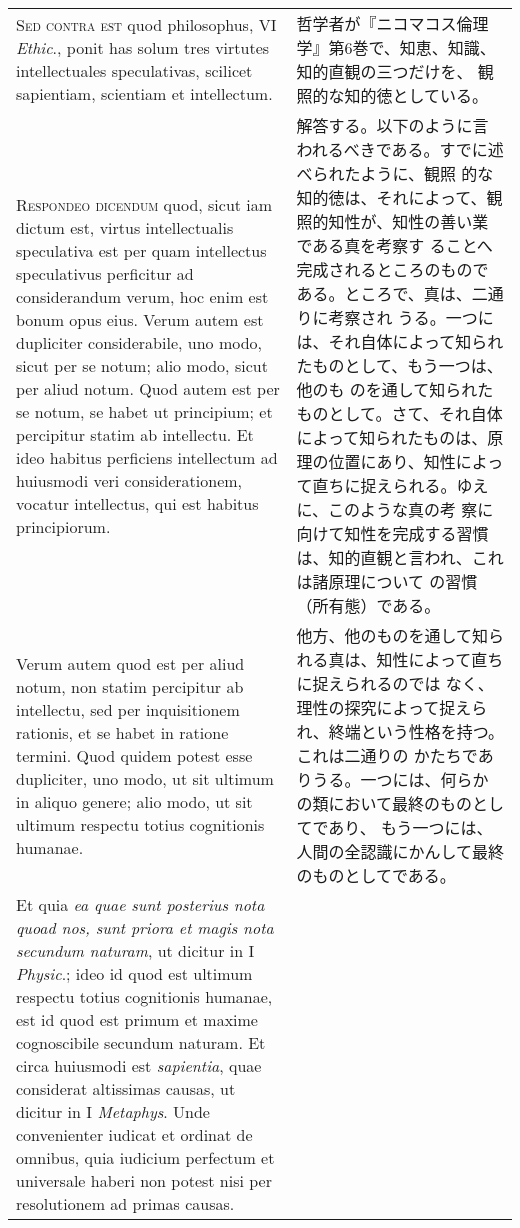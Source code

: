 \documentclass[10pt]{jsarticle}
\begin{document}
\begin{longtable}{p{21em}p{21em}}
\\

{\scshape Sed contra est} quod philosophus, VI {\itshape Ethic}.,
ponit has solum tres virtutes intellectuales speculativas, scilicet
sapientiam, scientiam et intellectum.

&

哲学者が『ニコマコス倫理学』第6巻で、知恵、知識、知的直観の三つだけを、
観照的な知的徳としている。

\\

{\scshape Respondeo dicendum} quod, sicut iam dictum est, virtus
intellectualis speculativa est per quam intellectus speculativus
perficitur ad considerandum verum, hoc enim est bonum opus eius. Verum
autem est dupliciter considerabile, uno modo, sicut per se notum; alio
modo, sicut per aliud notum. Quod autem est per se notum, se habet ut
principium; et percipitur statim ab intellectu. Et ideo habitus
perficiens intellectum ad huiusmodi veri considerationem, vocatur
intellectus, qui est habitus principiorum.

&

解答する。以下のように言われるべきである。すでに述べられたように、観照
的な知的徳は、それによって、観照的知性が、知性の善い業である真を考察す
ることへ完成されるところのものである。ところで、真は、二通りに考察され
うる。一つには、それ自体によって知られたものとして、もう一つは、他のも
のを通して知られたものとして。さて、それ自体によって知られたものは、原
理の位置にあり、知性によって直ちに捉えられる。ゆえに、このような真の考
察に向けて知性を完成する習慣は、知的直観と言われ、これは諸原理について
の習慣（所有態）である。

\\

Verum autem quod est per aliud notum, non statim percipitur ab
intellectu, sed per inquisitionem rationis, et se habet in ratione
termini. Quod quidem potest esse dupliciter, uno modo, ut sit ultimum
in aliquo genere; alio modo, ut sit ultimum respectu totius
cognitionis humanae.

&

他方、他のものを通して知られる真は、知性によって直ちに捉えられるのでは
なく、理性の探究によって捉えられ、終端という性格を持つ。これは二通りの
かたちでありうる。一つには、何らかの類において最終のものとしてであり、
もう一つには、人間の全認識にかんして最終のものとしてである。

\\

Et quia {\itshape ea quae sunt posterius nota quoad nos, sunt priora
et magis nota secundum naturam}, ut dicitur in I {\itshape Physic}.;
ideo id quod est ultimum respectu totius cognitionis humanae, est id
quod est primum et maxime cognoscibile secundum naturam. Et circa
huiusmodi est {\itshape sapientia}, quae considerat altissimas causas,
ut dicitur in I {\itshape Metaphys}. Unde convenienter iudicat et
ordinat de omnibus, quia iudicium perfectum et universale haberi non
potest nisi per resolutionem ad primas causas.


\end{longtable}
\end{document}
